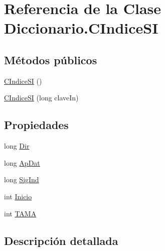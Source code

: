 \hypertarget{class_diccionario_1_1_c_indice_s_i}{\section{Referencia de la Clase Diccionario.\-C\-Indice\-S\-I}
\label{class_diccionario_1_1_c_indice_s_i}
}
\subsection*{Métodos públicos}
\begin{DoxyCompactItemize}
\item 
\hyperlink{class_diccionario_1_1_c_indice_s_i_ab2a5c4942a0f7c253f4caebfd5443a38}{C\-Indice\-S\-I} ()
\item 
\hyperlink{class_diccionario_1_1_c_indice_s_i_a25566ee5f73373dd81a28d2f6d626078}{C\-Indice\-S\-I} (long clave\-In)
\end{DoxyCompactItemize}
\subsection*{Propiedades}
\begin{DoxyCompactItemize}
\item 
long \hyperlink{class_diccionario_1_1_c_indice_s_i_a73614375d624290cb3e4f0c5fbe5b42e}{Dir}
\item 
long \hyperlink{class_diccionario_1_1_c_indice_s_i_a04b266544410afbf9f8b7c323f1c170e}{Ap\-Dat}
\item 
long \hyperlink{class_diccionario_1_1_c_indice_s_i_a2f1fbe842c13eff2c04f5eb180f1fb71}{Sig\-Ind}
\item 
int \hyperlink{class_diccionario_1_1_c_indice_s_i_ab1e9fce461dc0cdbe98c05f3757acfb2}{Inicio}
\item 
int \hyperlink{class_diccionario_1_1_c_indice_s_i_a80b80723af31e63e86872c52c0b7db72}{T\-A\-M\-A}
\end{DoxyCompactItemize}


\subsection{Descripción detallada}


